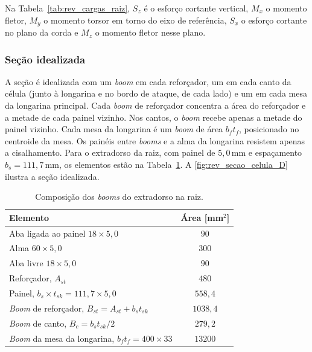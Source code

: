 \noindent Na Tabela~\ref{tab:rev_cargas_raiz}, $S_z$ é o esforço cortante vertical, $M_x$ o momento fletor, $M_y$ o momento torsor em torno do eixo de referência, $S_x$ o esforço cortante no plano da corda e $M_z$ o momento fletor nesse plano.
 
\subsubsection{Seção idealizada}
 
A seção é idealizada com um \textit{boom} em cada reforçador, um em cada canto da célula (junto à longarina e no bordo de ataque, de cada lado) e um em cada mesa da longarina principal. Cada \textit{boom} de reforçador concentra a área do reforçador e a metade de cada painel vizinho. Nos cantos, o \textit{boom} recebe apenas a metade do painel vizinho. Cada mesa da longarina é um \textit{boom} de área $b_f t_f$, posicionado no centroide da mesa. Os painéis entre \textit{booms} e a alma da longarina resistem apenas a cisalhamento. Para o extradorso da raiz, com painel de $5{,}0$\,mm e espaçamento $b_s = 111{,}7$\,mm, os elementos estão na Tabela~\ref{tab:rev_booms}. A \autoref{fig:rev_secao_celula_D} ilustra a seção idealizada.
 
\begin{table}[H]
\centering
\caption{Composição dos \textit{booms} do extradorso na raiz.}
\label{tab:rev_booms}
\begin{tabular}{lc}
\toprule
\textbf{Elemento} & \textbf{Área [mm$^2$]} \\
\midrule
Aba ligada ao painel $18 \times 5{,}0$                  & $90$ \\
Alma $60 \times 5{,}0$                                 & $300$ \\
Aba livre $18 \times 5{,}0$                            & $90$ \\
\midrule
Reforçador, $A_{st}$                                    & $480$ \\
Painel, $b_s \times t_{sk} = 111{,}7 \times 5{,}0$      & $558{,}4$ \\
\midrule
\textit{Boom} de reforçador, $B_{st} = A_{st} + b_s t_{sk}$     & $1038{,}4$ \\
\textit{Boom} de canto, $B_{c} = b_s t_{sk}/2$                  & $279{,}2$ \\
\textit{Boom} da mesa da longarina, $b_f t_f = 400 \times 33$ & $13200$ \\
\bottomrule
\end{tabular}
\end{table}
 
